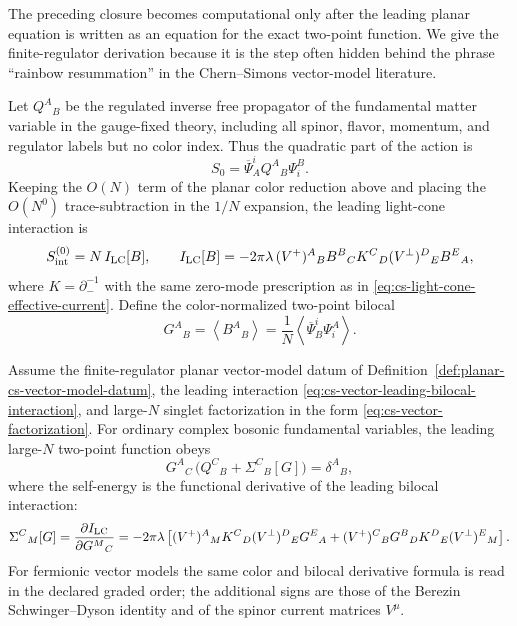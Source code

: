 The preceding closure becomes computational only after the leading planar
equation is written as an equation for the exact two-point function.  We give
the finite-regulator derivation because it is the step often hidden behind
the phrase ``rainbow resummation'' in the Chern--Simons vector-model
literature.

Let \(Q^A{}_{B}\) be the regulated inverse free propagator of the fundamental
matter variable in the gauge-fixed theory, including all spinor, flavor,
momentum, and regulator labels but no color index.  Thus the quadratic part
of the action is
\[
  S_0=\overline\Psi^i_A Q^A{}_{B}\Psi_i^B .
\]
Keeping the \(O(N)\) term of
the planar color reduction above and placing the
\(O(N^0)\) trace-subtraction in the \(1/N\) expansion, the leading
light-cone interaction is
\begin{equation}
  S_{\rm int}^{(0)}
  =
  N\,I_{\rm LC}[B],
  \qquad
  I_{\rm LC}[B]
  =
  -2\pi\lambda\,
  (V^+)^A{}_{B}B^B{}_{C}
  K^C{}_{D}
  (V^\perp)^D{}_{E}B^E{}_{A},
  \label{eq:cs-vector-leading-bilocal-interaction}
\end{equation}
where \(K=\partial_-^{-1}\) with the same zero-mode prescription as in
\eqref{eq:cs-light-cone-effective-current}.  Define the color-normalized
two-point bilocal
\[
  G^A{}_{B}
  =
  \left\langle B^A{}_{B}\right\rangle
  =
  \frac1N\left\langle\overline\Psi^i_B\Psi_i^A\right\rangle .
\]

\begin{proposition}
\label{prop:cs-vector-planar-self-energy-equation}
Assume the finite-regulator planar vector-model datum of
Definition~\ref{def:planar-cs-vector-model-datum}, the leading interaction
\eqref{eq:cs-vector-leading-bilocal-interaction}, and large-\(N\) singlet
factorization in the form
\eqref{eq:cs-vector-factorization}.  For ordinary complex bosonic fundamental
variables, the leading large-\(N\) two-point function obeys
\begin{equation}
  G^A{}_{C}\,
  \bigl(Q^C{}_{B}+\Sigma^C{}_{B}[G]\bigr)
  =
  \delta^A{}_{B},
  \label{eq:cs-vector-planar-dyson-equation}
\end{equation}
where the self-energy is the functional derivative of the leading bilocal
interaction:
\begin{equation}
  \Sigma^C{}_{M}[G]
  =
  \frac{\partial I_{\rm LC}}{\partial G^M{}_{C}}
  =
  -2\pi\lambda
  \left[
    (V^+)^A{}_{M}K^C{}_{D}(V^\perp)^D{}_{E}G^E{}_{A}
    +
    (V^+)^C{}_{B}G^B{}_{D}K^D{}_{E}(V^\perp)^E{}_{M}
  \right].
  \label{eq:cs-vector-planar-self-energy-functional}
\end{equation}
For fermionic vector models the same color and bilocal derivative formula is
read in the declared graded order; the additional signs are those of the
Berezin Schwinger--Dyson identity and of the spinor current matrices
\(V^\mu\).
\end{proposition}

